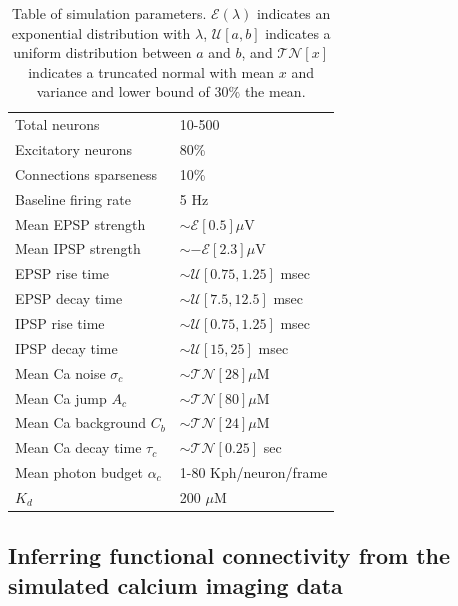 \begin{table}[h!b!p!]
\caption{Table of simulation parameters. $\mathcal{E}(\lambda)$ indicates an exponential distribution with $\lambda$, $\mathcal{U}[a,b]$ indicates a uniform distribution between $a$ and $b$, and $\mathcal{TN}[x]$ indicates a truncated normal with mean $x$ and variance and lower bound of $30 \%$ the mean.}\label{table:caparm}
\begin{tabular}{ll}
\hline
Total neurons & 10-500 \\
Excitatory neurons & 80\% \\
Connections sparseness & 10\% \\
Baseline firing rate & 5  Hz\\
\hline
Mean EPSP strength 	& $\sim \mathcal{E}[0.5] \mu$V \\
Mean IPSP strength 	& $\sim -\mathcal{E}[2.3] \mu$V \\
EPSP rise time 		& $\sim \mathcal{U}[0.75, 1.25]$ msec \\
EPSP decay time 	& $\sim \mathcal{U}[7.5, 12.5]$ msec \\
IPSP rise time 		& $\sim \mathcal{U}[0.75, 1.25]$ msec \\
IPSP decay time 	& $\sim \mathcal{U}[15, 25]$ msec \\
\hline
Mean Ca noise $\sigma_c$ & $\sim \mathcal{TN} [28] \mu$M \\
Mean Ca jump $A_c$ &  $\sim \mathcal{TN} [80] \mu$M \\
Mean Ca background $C_b$ & $\sim \mathcal{TN} [24] \mu$M \\
Mean Ca decay time $\tau_c$ & $\sim \mathcal{TN} [0.25]$ sec \\
Mean photon budget $\alpha_c$ & 1-80 Kph/neuron/frame \\
$K_d$ & 200 $\mu$M \\
\hline
\end{tabular}
\end{table}


\subsection{Inferring functional connectivity from the simulated calcium imaging data} \label{sec:results:inference}

